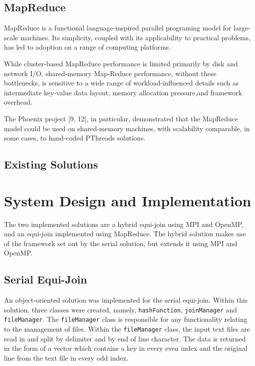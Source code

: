 \documentclass[10pt,twocolumn]{witseiepaper}
\begin{document}
\subsection{MapReduce}

MapReduce is a functional language-inspired parallel programing model for large-scale machines. Its simplicity, coupled with its applicability to practical problems, has led to adoption on a range of computing platforms. 

While cluster-based MapReduce performance is limited primarily by disk and network I/O, shared-memory Map-Reduce performance, without these bottlenecks, is sensitive to a wide range of workload-influenced details such as intermediate key-value data layout, memory allocation pressure,and framework overhead.

The Phoenix project [9, 12], in particular, demonstrated that the MapReduce model could be used on shared-memory machines, with scalability comparable, in some cases, to hand-coded PThreads solutions.

\subsection{Existing Solutions}

\section{System Design and Implementation}
The two implemented solutions are a hybrid equi-join using MPI and OpenMP, and an equi-join implemented using MapReduce. The hybrid solution makes use of the framework set out by the serial solution, but extends it using MPI and OpenMP.

\subsection{Serial Equi-Join}
An object-oriented solution was implemented for the serial equi-join. Within this solution, three classes were created, namely, \texttt{hashFunction}, \texttt{joinManager} and \texttt{fileManager}. The \texttt{fileManager} class is responsible for any functionality relating to the management of files. Within the \texttt{fileManager} class, the input text files are read in and split by delimiter and by end of line character. The data is returned in the form of a vector which contains a key in every even index and the original line from the text file in every odd index.
\end{document}
